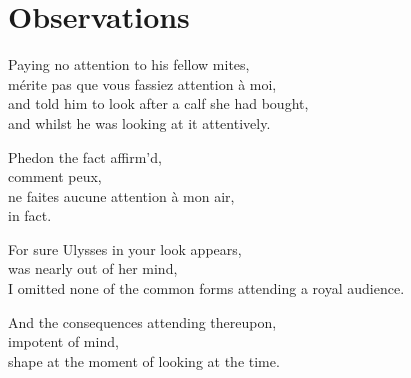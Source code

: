 
\chapter{Observations}
\label{ch:observations}

\startcontents[chapters]

\vfill

Paying no attention to his fellow mites, \\
mérite pas que vous fassiez attention à moi, \\
and told him to look after a calf she had bought, \\
and whilst he was looking at it attentively.

Phedon the fact affirm'd, \\
comment peux, \\
ne faites aucune attention à mon air, \\
in fact.

For sure Ulysses in your look appears, \\
was nearly out of her mind, \\
I omitted none of the common forms attending a royal audience.

And the consequences attending thereupon, \\
impotent of mind, \\
shape at the moment of looking at the time.

\newpage
\minicontents
\spirals



\stopcontents[chapters]
